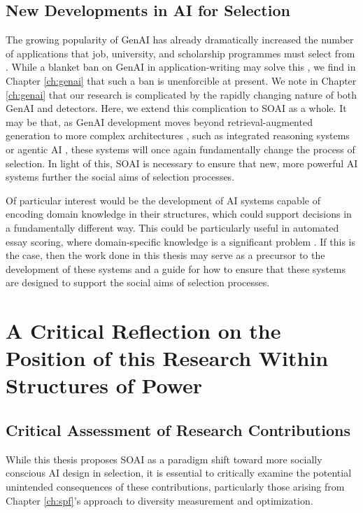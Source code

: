 \subsection{New Developments in AI for Selection}
The growing popularity of GenAI has already dramatically increased the number of applications that job, university, and scholarship programmes must select from \cite{Kaashoek2024Impact}. While a blanket ban on GenAI in application-writing may solve this \cite{h_holden_thorp_chatgpt_2023}, we find in Chapter \ref{ch:genai} that such a ban is unenforcible at present. We note in Chapter \ref{ch:genai} that our research is complicated by the rapidly changing nature of both GenAI and detectors. Here, we extend this complication to SOAI as a whole. It may be that, as GenAI development moves beyond retrieval-augmented generation to more complex architectures \cite{lewis2020retrieval}, such as integrated reasoning systems or agentic AI \cite{OKeefeetal}, these systems will once again fundamentally change the process of selection. In light of this, SOAI is necessary to ensure that new, more powerful AI systems further the social aims of selection processes.

Of particular interest would be the development of AI systems capable of encoding domain knowledge in their structures, which could support decisions in a fundamentally different way. This could be particularly useful in automated essay scoring, where domain-specific knowledge is a significant problem \cite{elijahthesis}. If this is the case, then the work done in this thesis may serve as a precursor to the development of these systems and a guide for how to ensure that these systems are designed to support the social aims of selection processes.

\section{A Critical Reflection on the Position of this Research Within Structures of Power}\label{sec:reflexivity}

\subsection{Critical Assessment of Research Contributions}
While this thesis proposes SOAI as a paradigm shift toward more socially conscious AI design in selection, it is essential to critically examine the potential unintended consequences of these contributions, particularly those arising from Chapter \ref{ch:spf}'s approach to diversity measurement and optimization.

